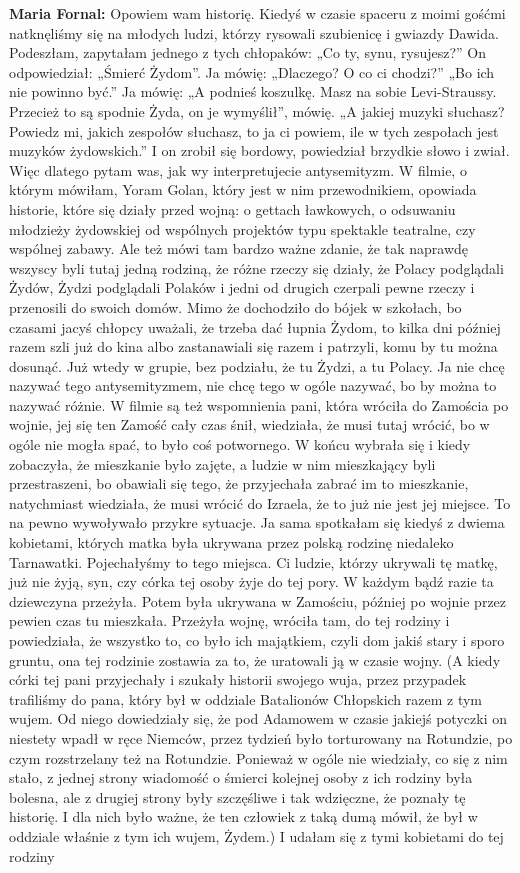 {\textbf{Maria Fornal:} Opowiem wam historię. Kiedyś w czasie spaceru z moimi gośćmi natknęliśmy się na młodych ludzi, którzy rysowali szubienicę i gwiazdy Dawida. Podeszłam, zapytałam jednego z tych chłopaków: „Co ty, synu, rysujesz?” On odpowiedział: „Śmierć Żydom”. Ja mówię: „Dlaczego? O co ci chodzi?” „Bo ich nie powinno być.” Ja mówię: „A podnieś koszulkę. Masz na sobie Levi-Straussy. Przecież to są spodnie Żyda, on je wymyślił”, mówię. „A jakiej muzyki słuchasz? Powiedz mi, jakich zespołów słuchasz, to ja ci powiem, ile w tych zespołach jest muzyków żydowskich.” I on zrobił się bordowy, powiedział brzydkie słowo i zwiał. Więc dlatego pytam was, jak wy interpretujecie antysemityzm. W filmie, o którym mówiłam, Yoram Golan, który jest w nim przewodnikiem, opowiada historie, które się działy przed wojną: o gettach ławkowych, o odsuwaniu młodzieży żydowskiej od wspólnych projektów typu spektakle teatralne, czy wspólnej zabawy. Ale też mówi tam bardzo ważne zdanie, że tak naprawdę wszyscy byli tutaj jedną rodziną, że różne rzeczy się działy, że Polacy podglądali Żydów, Żydzi podglądali Polaków i jedni od drugich czerpali pewne rzeczy i przenosili do swoich domów. Mimo że dochodziło do bójek w szkołach, bo czasami jacyś chłopcy uważali, że trzeba dać łupnia Żydom, to kilka dni później razem szli już do kina albo zastanawiali się razem i patrzyli, komu by tu można dosunąć. Już wtedy w grupie, bez podziału, że tu Żydzi, a tu Polacy. Ja nie chcę nazywać tego antysemityzmem, nie chcę tego w ogóle nazywać, bo by można to nazywać różnie. W filmie są też wspomnienia pani, która wróciła do Zamościa po wojnie, jej się ten Zamość cały czas śnił, wiedziała, że musi tutaj wrócić, bo w ogóle nie mogła spać, to było coś potwornego. W końcu wybrała się i kiedy zobaczyła, że mieszkanie było zajęte, a ludzie w nim mieszkający byli przestraszeni, bo obawiali się tego, że przyjechała zabrać im to mieszkanie, natychmiast wiedziała, że musi wrócić do Izraela, że to już nie jest jej miejsce. To na pewno wywoływało przykre sytuacje. Ja sama spotkałam się kiedyś z dwiema kobietami, których matka była ukrywana przez polską rodzinę niedaleko Tarnawatki. Pojechałyśmy to tego miejsca. Ci ludzie, którzy ukrywali tę matkę, już nie żyją, syn, czy córka tej osoby żyje do tej pory. W każdym bądź razie ta dziewczyna przeżyła. Potem była ukrywana w Zamościu, później po wojnie przez pewien czas tu mieszkała. Przeżyła wojnę, wróciła tam, do tej rodziny i powiedziała, że wszystko to, co było ich majątkiem, czyli dom jakiś stary i sporo gruntu, ona tej rodzinie zostawia za to, że uratowali ją w czasie wojny. (A kiedy córki tej pani przyjechały i szukały historii swojego wuja, przez przypadek trafiliśmy do pana, który był w oddziale Batalionów Chłopskich razem z tym wujem. Od niego dowiedziały się, że pod Adamowem w czasie jakiejś potyczki on niestety wpadł w ręce Niemców, przez tydzień było torturowany na Rotundzie, po czym rozstrzelany też na Rotundzie. Ponieważ w ogóle nie wiedziały, co się z nim stało, z jednej strony wiadomość o śmierci kolejnej osoby z ich rodziny była bolesna, ale z drugiej strony były szczęśliwe i tak wdzięczne, że poznały tę historię. I dla nich było ważne, że ten człowiek z taką dumą mówił, że był w oddziale właśnie z tym ich wujem, Żydem.) I udałam się z tymi kobietami do tej rodziny }
